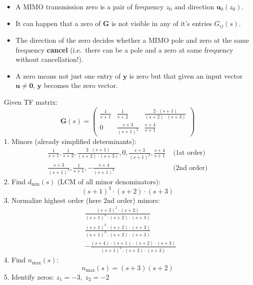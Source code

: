 
\begin{itemize}
    \item A MIMO transmission zero is a pair of frequency $z_0$ and direction $\mathbf{u}_0(z_0)$.
    \item It can happen that a zero of $\mathbf{G}$ is not visible in any of it's entries $G_{ij}(s)$.
    \item The direction of the zero decides whether a MIMO pole and zero at the same frequency \textbf{cancel} (i.e.\ there can be a pole and a zero at same frequency without cancellation!).
    \item A zero means not just one entry of $\mathbf{y}$ is zero but that given an input vector $\mathbf{u} \ne \mathbf{0}$, $\mathbf{y}$ becomes the zero vector.
\end{itemize}

\begin{examplesection}
    Given TF matrix:
    \begin{equation*}
        \mathbf{G}(s)=\begin{pmatrix}
            \frac1{s+1} & \frac1{s+2}           & \frac{2\cdot(s+1)}{(s+2)\cdot(s+3)} \\
            0           & \frac{s+3}{{(s+1)}^2} & \frac{s+4}{s+1}
        \end{pmatrix}
    \end{equation*}
    1. Minors (already simplified determinants):
    \begin{align*}
        \frac{1}{s+1},\frac{1}{s+2},\frac{2\cdot(s+1)}{(s+2)\cdot(s+3)},0,\frac{s+3}{{(s+1)}^{2}},\frac{s+4}{s+1} & \text{ (1st order)} \\
        \frac{s+3}{{(s+1)}^3},\frac{1}{s+1},-\frac{s+4}{{(s+1)}^2}                                                & \text{ (2nd order)}
    \end{align*}
    2. Find $d_{\min}(s)$ (LCM of all minor denominators):
    \begin{equation*}
        {(s+1)}^3\cdot(s+2)\cdot(s+3)
    \end{equation*}
    3. Normalize highest order (here 2nd order) minors:
    \begin{align*}
         & \frac{{(s+3)}^2\cdot(s+2)}{{(s+1)}^3\cdot(s+2)\cdot(s+3)}                  \\
         & \frac{{(s+1)}^2\cdot(s+2)\cdot(s+3)}{{(s+1)}^3\cdot(s+2)\cdot(s+3)}        \\
         & -\frac{(s+4)\cdot(s+1)\cdot(s+2)\cdot(s+3)}{{(s+1)}^3\cdot(s+2)\cdot(s+3)}
    \end{align*}
    4. Find $n_{\max}(s)$:
    \begin{equation*}
        n_{\max}(s)=(s+3)(s+2)
    \end{equation*}
    5. Identify zeros: $z_1=-3,\;z_2=-2$
\end{examplesection}

